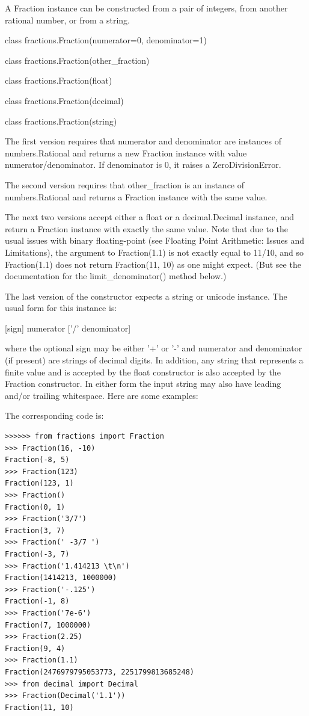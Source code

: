 A Fraction instance can be constructed from a pair of integers, from another rational number, or from a string.

\vpara
class fractions.Fraction(numerator=0, denominator=1)

class fractions.Fraction(other\_fraction)

class fractions.Fraction(float)

class fractions.Fraction(decimal)

class fractions.Fraction(string)

\vpara
The first version requires that numerator and denominator are instances of numbers.Rational and returns a new Fraction instance with value numerator/denominator. If denominator is 0, it raises a ZeroDivisionError. 

\vpara
The second version requires that other\_fraction is an instance of numbers.Rational and returns a Fraction instance with the same value. 

\vpara
The next two versions accept either a float or a decimal.Decimal instance, and return a Fraction instance with exactly the same value. Note that due to the usual issues with binary floating-point (see Floating Point Arithmetic: Issues and Limitations), the argument to Fraction(1.1) is not exactly equal to 11/10, and so Fraction(1.1) does not return Fraction(11, 10) as one might expect. (But see the documentation for the limit\_denominator() method below.) 

\vpara
The last version of the constructor expects a string or unicode instance. The usual form for this instance is:


[sign] numerator ['/' denominator]


where the optional sign may be either '+' or '-' and numerator and denominator (if present) are strings of decimal digits. In addition, any string that represents a finite value and is accepted by the float constructor is also accepted by the Fraction constructor. In either form the input string may also have leading and/or trailing whitespace. Here are some examples:


\vpara
The corresponding code is:

\begin{lstlisting}
>>>>>> from fractions import Fraction
>>> Fraction(16, -10)
Fraction(-8, 5)
>>> Fraction(123)
Fraction(123, 1)
>>> Fraction()
Fraction(0, 1)
>>> Fraction('3/7')
Fraction(3, 7)
>>> Fraction(' -3/7 ')
Fraction(-3, 7)
>>> Fraction('1.414213 \t\n')
Fraction(1414213, 1000000)
>>> Fraction('-.125')
Fraction(-1, 8)
>>> Fraction('7e-6')
Fraction(7, 1000000)
>>> Fraction(2.25)
Fraction(9, 4)
>>> Fraction(1.1)
Fraction(2476979795053773, 2251799813685248)
>>> from decimal import Decimal
>>> Fraction(Decimal('1.1'))
Fraction(11, 10)
\end{lstlisting}

